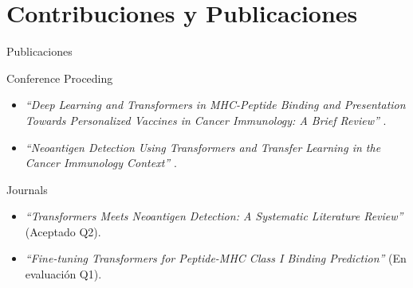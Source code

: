 \documentclass[10pt]{beamer}
\newcommand{\1}{
	\setbeamertemplate{background}{
		\texttt{[image: img/1]}
		\tikz[overlay] \fill[fill opacity=0.75,fill=white] (0,0) rectangle (-\paperwidth,\paperheight);
	}
}
\begin{document}
\section{Contribuciones y Publicaciones}

\begin{frame}{Publicaciones}{}	
	\begin{block}{Conference Proceding}
		\begin{itemize}
			\item \textit{``Deep Learning and Transformers in MHC-Peptide Binding and Presentation Towards Personalized Vaccines in Cancer Immunology: A Brief Review''} \cite{machaca2023deep}.
			\item \textit{``Neoantigen Detection Using Transformers and Transfer Learning in the Cancer Immunology Context''} \cite{arceda2023neoantigen}.
		\end{itemize}
	\end{block}	

	\begin{block}{Journals}
		\begin{itemize}
			\item \textit{``Transformers Meets Neoantigen Detection: A Systematic Literature Review''} (Aceptado Q2).
			\item \textit{``Fine-tuning Transformers for Peptide-MHC Class I Binding Prediction''} (En evaluación Q1).
		\end{itemize}
	\end{block}
	
	
\end{frame}
\end{document}
